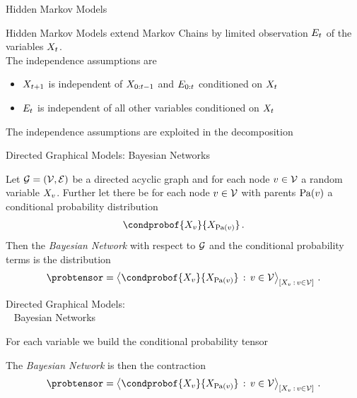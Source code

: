 \documentclass{beamer}
\begin{document}
\begin{frame}{Hidden Markov Models}

Hidden Markov Models extend Markov Chains by limited observation $E_{t}$ of the variables $X_{t}$. \\
\medskip 
The independence assumptions are 
\begin{itemize}
	\item $X_{t+1}$ is independent of $X_{0:t-1}$ and $E_{0:t}$ conditioned on $X_{t}$
	\item $E_{t}$ is independent of all other variables conditioned on $X_{t}$
\end{itemize}
\medskip 
The independence assumptions are exploited in the decomposition
\begin{center}
	
\end{center}

\end{frame}



\begin{frame}{Directed Graphical Models: Bayesian Networks}

\begin{definition}
	Let $\mathcal{G}=(\mathcal{V},\mathcal{E})$ be a directed acyclic graph and for each node $v\in\mathcal{V}$ a random variable $X_{v}$.
	Further let there be for each node $v\in\mathcal{V}$ with parents $\mathrm{Pa}(v)$ a conditional probability distribution
		\[ \condprobof{\catvariableof{\node}}{\catvariableof{\parentsof{\node}}} \, . \]
	Then the \emph{Bayesian Network} with respect to $\mathcal{G}$ and the conditional probability terms is the distribution
	\begin{align*}
		\probtensor = \contractionof{\condprobof{\catvariableof{\node}}{\catvariableof{\parentsof{\node}}} \, : \, \nodein}{\catvariableof{\node} \, : \, \nodein} \, .
	\end{align*}
\end{definition}

\end{frame}



\begin{frame}{Directed Graphical Models:\\ 
Bayesian Networks}

For each variable we build the conditional probability tensor
\begin{center}
	
\end{center}
The \emph{Bayesian Network} is then the contraction
	\begin{align*}
		\probtensor = \contractionof{\condprobof{\catvariableof{\node}}{\catvariableof{\parentsof{\node}}} \, : \, \nodein}{\catvariableof{\node} \, : \, \nodein} \, .
	\end{align*}

\end{frame}
\end{document}
